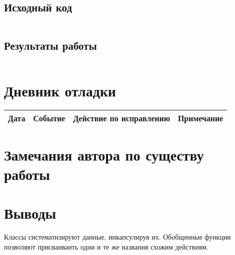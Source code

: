 \documentclass[12pt]{article}
\begin{document}
\subsection{Исходный код}
\inputminted[linenos, frame=lines]{lisp}{./classes.lisp}

\subsection{Результаты работы}
\inputminted[frame=lines]{lisp}{./log.lisp}

\section{Дневник отладки}
\begin{tabular}{|c|c|c|c|}
\hline
Дата & Событие & Действие по исправлению & Примечание \\
\hline
\end{tabular}

\section{Замечания автора по существу работы}

\section{Выводы}

Классы систематизируют данные, инкапсулируя их. Обобщенные функции позволяют присваиваить одни и те же 
названия схожим действиям.
\end{document}
